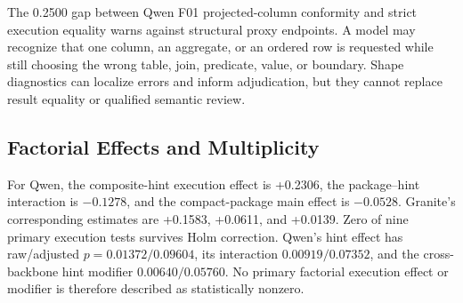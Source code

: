 \documentclass[applsci,article,submit,moreauthors]{Definitions/mdpi}
\begin{document}
The 0.2500 gap between Qwen F01 projected-column conformity and strict execution equality warns against structural proxy endpoints. A model may recognize that one column, an aggregate, or an ordered row is requested while still choosing the wrong table, join, predicate, value, or boundary. Shape diagnostics can localize errors and inform adjudication, but they cannot replace result equality or qualified semantic review.

\subsection{Factorial Effects and Multiplicity}

For Qwen, the composite-hint execution effect is +0.2306, the package--hint interaction is $-0.1278$, and the compact-package main effect is $-0.0528$. Granite's corresponding estimates are +0.1583, +0.0611, and +0.0139. Zero of nine primary execution tests survives Holm correction. Qwen's hint effect has raw/adjusted $p=0.01372/0.09604$, its interaction $0.00919/0.07352$, and the cross-backbone hint modifier $0.00640/0.05760$. No primary factorial execution effect or modifier is therefore described as statistically nonzero.

\begin{table}[htbp]
\caption{Complete primary factorial family for strict execution equality. Estimates are question-weighted finite-set differences; intervals are 95\% normalized-SQL-group composition-sensitivity intervals. Each sign-randomization used 70 groups, 100,000 draws, and the displayed raw values were Holm-adjusted jointly over all nine rows.}
\label{tab:factorial-nine}\centering\scriptsize
{}
\end{table}
\end{document}
